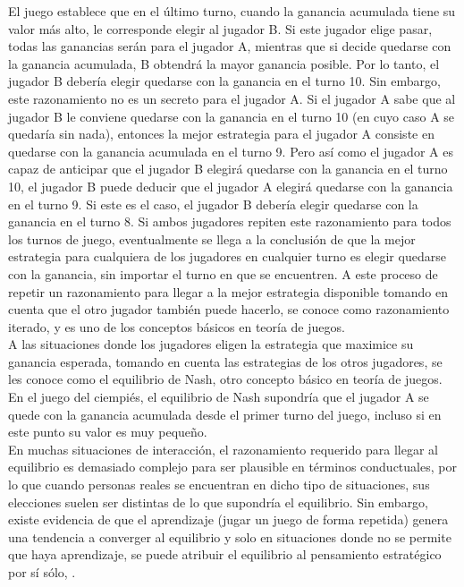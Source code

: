 El juego establece que en el último turno, cuando la ganancia acumulada tiene su valor más alto, le corresponde elegir al jugador B. Si este jugador elige pasar, todas las ganancias serán para el jugador A, mientras que si decide quedarse con la ganancia acumulada, B obtendrá la mayor ganancia posible. Por lo tanto, el jugador B debería elegir quedarse con la ganancia en el turno 10. Sin embargo, este razonamiento no es un secreto para el jugador A. Si el jugador A sabe que al jugador B le conviene quedarse con la ganancia en el turno 10 (en cuyo caso A se quedaría sin nada), entonces la mejor estrategia para el jugador A consiste en quedarse con la ganancia acumulada en el turno 9. Pero así como el jugador A es capaz de anticipar que el jugador B elegirá quedarse con la ganancia en el turno 10, el jugador B puede deducir que el jugador A elegirá quedarse con la ganancia en el turno 9. Si este es el caso, el jugador B debería elegir quedarse con la ganancia en el turno 8. Si ambos jugadores repiten este razonamiento para todos los turnos de juego, eventualmente se llega a la conclusión de que la mejor estrategia para cualquiera de los jugadores en cualquier turno es elegir quedarse con la ganancia, sin importar el turno en que se encuentren. A este proceso de repetir un razonamiento para llegar a la mejor estrategia disponible tomando en cuenta que el otro jugador también puede hacerlo, se conoce como razonamiento iterado, y es uno de los conceptos básicos en teoría de juegos.\\

A las situaciones donde los jugadores eligen la estrategia que maximice su ganancia esperada, tomando en cuenta las estrategias de los otros jugadores, se les conoce como el equilibrio de Nash, otro concepto básico en teoría de juegos. En el juego del ciempiés, el equilibrio de Nash supondría que el jugador A se quede con la ganancia acumulada desde el primer turno del juego, incluso si en este punto su valor es muy pequeño.\\

En muchas situaciones de interacción, el razonamiento requerido para llegar al equilibrio es demasiado complejo para ser plausible en términos conductuales, por lo que cuando personas reales se encuentran en dicho tipo de situaciones, sus elecciones suelen ser distintas de lo que supondría el equilibrio. Sin embargo, existe evidencia de que el aprendizaje (jugar un juego de forma repetida) genera una tendencia a converger al equilibrio y solo en situaciones donde no se permite que haya aprendizaje, se puede atribuir el equilibrio al pensamiento estratégico por sí sólo, \parencite{Crawford2013}.\\

